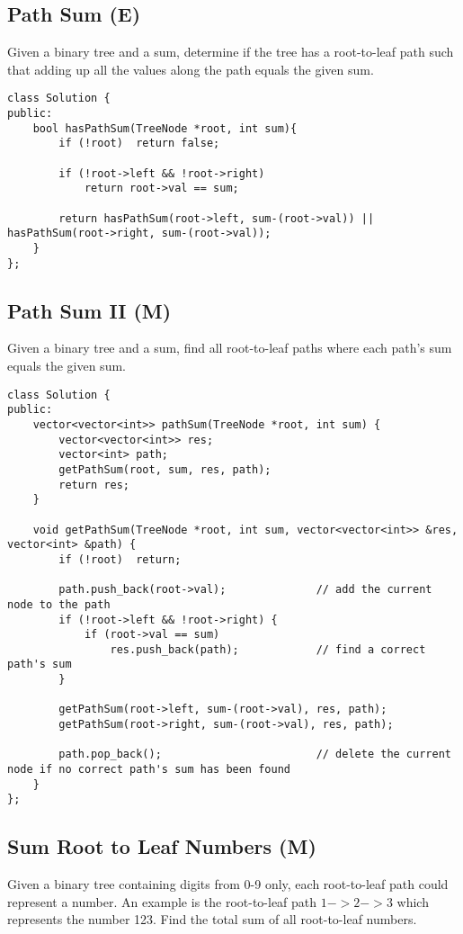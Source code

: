 \subsection{Path Sum (E)}
Given a binary tree and a sum, determine if the tree has a root-to-leaf path such that adding up all the values along the path equals the given sum. \\

\begin{lstlisting}
class Solution {
public:
    bool hasPathSum(TreeNode *root, int sum){
        if (!root)  return false;
        
        if (!root->left && !root->right)
            return root->val == sum;
            
        return hasPathSum(root->left, sum-(root->val)) || hasPathSum(root->right, sum-(root->val));
    }
};
\end{lstlisting}


\subsection{Path Sum II (M)}
Given a binary tree and a sum, find all root-to-leaf paths where each path's sum equals the given sum. \\
 
\begin{lstlisting}
class Solution {
public:
    vector<vector<int>> pathSum(TreeNode *root, int sum) {
        vector<vector<int>> res;
        vector<int> path;
        getPathSum(root, sum, res, path);
        return res;
    }
    
    void getPathSum(TreeNode *root, int sum, vector<vector<int>> &res, vector<int> &path) {
        if (!root)  return;
        
        path.push_back(root->val);              // add the current node to the path
        if (!root->left && !root->right) {
            if (root->val == sum)
                res.push_back(path);            // find a correct path's sum
        }
        
        getPathSum(root->left, sum-(root->val), res, path);
        getPathSum(root->right, sum-(root->val), res, path);

        path.pop_back();                        // delete the current node if no correct path's sum has been found
    }
};
\end{lstlisting}


\subsection{Sum Root to Leaf Numbers (M)}
Given a binary tree containing digits from 0-9 only, each root-to-leaf path could represent a number. An example is the root-to-leaf path $1->2->3$ which represents the number 123. Find the total sum of all root-to-leaf numbers.\\

